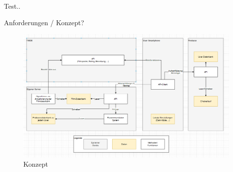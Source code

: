 \label{sec:app_concept}

Test..

Anforderungen / Konzept?

\begin{figure}[h]
\centering
\includegraphics[width=14cm]{images/Konzept.PNG}
\caption{Konzept}
\end{figure}